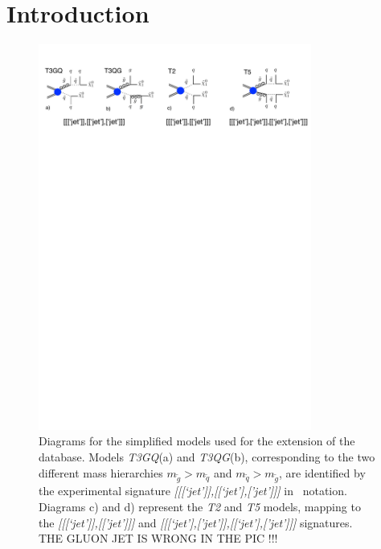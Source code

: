 \documentclass[epj,nopacs,fleqn]{svjour}
\begin{document}
\newcommand{\FASTLIM}{\texttt{FastLim}} 

\newcommand{\TGQ}{ \textit{T3GQ}} 
\newcommand{\Tone}{ \textit{T1}} 
\newcommand{\Ttwo}{ \textit{T2}} 
\newcommand{\Tfive}{ \textit{T5}} 

\newcommand{\ONE}{\onecolumn}

\newcommand{\TWO}{\twocolumn}

%
\section{Introduction}
\begin{figure}
	\begin{center}
		\includegraphics[width=0.8\textwidth]{PLOTS/Diagrams_2}
	\end{center}
	\caption{Diagrams for the simplified models used for the extension of the database. Models \textit{T3GQ}(a) and \textit{T3QG}(b), corresponding to the two different mass hierarchies $m_{\tilde g} > m_{\tilde q}$ and $m_{\tilde q} > m_{\tilde g}$, are identified by the experimental signature \textit{[[[`jet']],[[`jet'],['jet']]]} in \SMO~notation. Diagrams c) and d) represent the \textit{T2} and \textit{T5} models, mapping to the \textit{[[[`jet']],[['jet']]]} and \textit{[[[`jet'],['jet']],[[`jet'],['jet']]]} signatures. {\color{blue} THE GLUON JET IS WRONG IN THE PIC !!!}}
	\label{Diagrams}
\end{figure}
\end{document}
